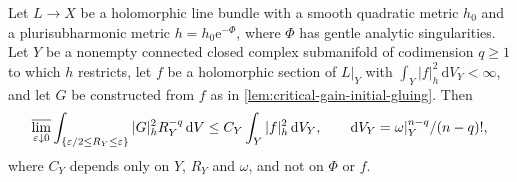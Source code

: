 \begin{lemma}\label{lem:gentle-weighted-normal-residue}
Let $L\to X$ be a holomorphic line bundle with a smooth quadratic metric $h_0$ and a plurisubharmonic metric $h=h_0\mathrm e^{-\Phi}$, where $\Phi$ has gentle analytic singularities. Let $Y$ be a nonempty connected closed complex submanifold of codimension $q\geq1$ to which $h$ restricts, let $f$ be a holomorphic section of $L|_Y$ with $\int_Y|f|_h^2\,\mathrm dV_Y<\infty$, and let $G$ be constructed from $f$ as in \cref{lem:critical-gain-initial-gluing}. Then
\begin{equation}\label{eq:gentle-weighted-normal-residue}
 \varlimsup_{\varepsilon\downarrow0}
 \int_{\{\varepsilon/2\leq R_Y\leq\varepsilon\}}
                       |G|_h^2R_Y^{-q}\,\mathrm dV
       \leq C_Y\int_Y|f|_h^2\,\mathrm dV_Y,
 \qquad \mathrm dV_Y=\omega|_Y^{n-q}/(n-q)!,
\end{equation}
where $C_Y$ depends only on $Y$, $R_Y$ and $\omega$, and not on $\Phi$ or $f$.
\end{lemma}
